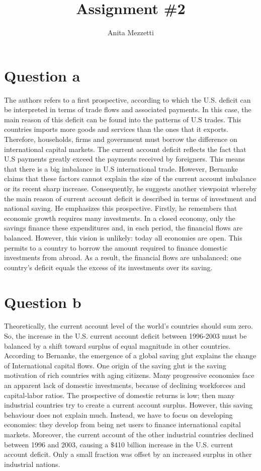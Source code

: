 \documentclass[	11pt, ]{fphw}
\title{Assignment \#2} %
\author{Anita Mezzetti}
\institute{École polytechnique fédérale de Lausanne}
\begin{document}
\maketitle 
\section*{Question a}
The authors refers to a first prospective, according to which the U.S. deficit can be interpreted in terms of trade flows and associated payments. In this case, the main reason of this deficit can be found into the patterns of U.S trades. This countries imports more goods and services than the ones that it exports. Therefore, households, firms and government must borrow the difference on international capital markets. The current account deficit reflects the fact that U.S payments greatly exceed the payments received by foreigners. This means that there is a big imbalance in U.S international trade.
However, Bernanke claims that these factors cannot explain the size of the current account imbalance or its recent sharp increase. Consequently, he suggests another viewpoint whereby the main reason of current account deficit is described in terms of investment and national saving. He emphasizes this prospective. Firstly, he remembers that economic growth requires many investments. In a closed economy, only the savings finance these expenditures and, in each period, the financial flows are balanced. However, this vision is unlikely: today all economies are open. This permits to a country to borrow the amount required to finance domestic investments from abroad. As a result, the financial flows are unbalanced: one country’s deficit equals the excess of its investments over its saving.


\section*{Question b}
Theoretically, the current account level of the world’s countries should sum zero. So, the increase in the U.S. current account deficit between 1996-2003 must be balanced by a shift toward surplus of equal magnitude in other countries. \\
According to Bernanke, the emergence of a global saving glut explains the change of International capital flows. One origin of the saving glut is the saving motivation of rich countries with aging citizens. Many progressive economies face an apparent lack of domestic investments, because of declining workforces and capital-labor ratios. The prospective of domestic returns is low; then many industrial countries try to create a current account surplus. 
However, this saving behaviour does not explain much. Instead, we have to focus on developing economies: they develop from being net users to finance international capital markets. Moreover, the current account of the other industrial countries declined between 1996 and 2003, causing a $\$$410 billion increase in the U.S. current account deficit. Only a small fraction was offset by an increased surplus in other industrial nations.
\end{document}
